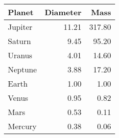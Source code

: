 \begin{table*}[tb]
{\begin{tabularx}{0.3\linewidth}{@{}Xrr@{}}
  \end{tabularx}
  \hspace{\fill}
  \begin{tabularx}{0.3\linewidth}{@{}Xrr@{}} %
    \toprule
    Planet & Diameter & Mass \\
    \midrule
    Jupiter & 11.21 & 317.80 \\
    Saturn & 9.45 & 95.20 \\
    Uranus & 4.01 & 14.60 \\
    Neptune & 3.88 & 17.20 \\
    Earth & 1.00 & 1.00 \\
    Venus & 0.95 & 0.82 \\
    Mars & 0.53 & 0.11 \\
    Mercury & 0.38 & 0.06 \\
    \bottomrule
  \end{tabularx}
  }
\end{table*}